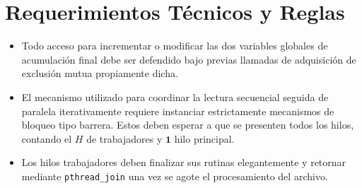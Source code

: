 \documentclass[12pt,a4paper]{article}
\begin{document}
\section*{Requerimientos Técnicos y Reglas}
\begin{itemize}[itemsep=1ex]
    \item Todo acceso para incrementar o modificar las dos variables globales de acumulación final debe ser defendido bajo previas llamadas de adquisición de exclusión mutua propiamente dicha.
    \item El mecanismo utilizado para coordinar la lectura secuencial seguida de paralela iterativamente requiere instanciar estrictamente mecanismos de bloqueo tipo barrera. Estos deben esperar a que se presenten todos los hilos, contando el $H$ de trabajadores y $\mathbf{1}$ hilo principal.
    \item Los hilos trabajadores deben finalizar sus rutinas elegantemente y retornar mediante \texttt{pthread\_join} una vez se agote el procesamiento del archivo.
\end{itemize}
\end{document}
